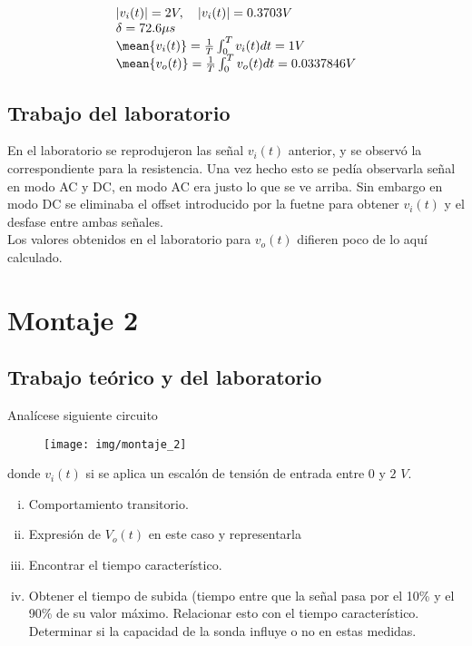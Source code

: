 \documentclass[a4paper,10pt]{article}
\begin{document}
\begin{equation}
 \begin{array}{l}
  |v_i(t)| = 2 V, \quad |v_i(t)| = 0.3703 V \\
  \delta = 72.6 \mu s \\
  \mean{v_i(t)} = \frac{1}{T} \int^T_0 v_i(t) dt = 1 V \\
  \mean{v_o(t)} = \frac{1}{T} \int^T_0 v_o(t) dt = 0.0337846 V
 \end{array}
\end{equation}

\subsection{Trabajo del laboratorio}

En el laboratorio se reprodujeron las señal $v_i(t)$ anterior, y se observó la correspondiente para la resistencia. Una
vez hecho esto se pedía observarla señal en modo AC y DC, en modo AC era justo lo que se ve arriba. Sin embargo en modo
DC se eliminaba el offset introducido por la fuetne para obtener $v_i(t)$ y el desfase entre ambas señales. \\ 

Los valores obtenidos en el laboratorio para $v_o(t)$ difieren poco de lo aquí calculado. 

\section{Montaje 2}

\subsection{Trabajo teórico y del laboratorio}

Analícese siguiente circuito

\begin{figure}[h!]
 \centering
 \texttt{[image: img/montaje\_2]}
\end{figure}

donde $v_i(t)$ si se aplica un escalón de tensión de entrada entre $0$ y $2$ $V$. 

\begin{enumerate}[(i)]
 \item Comportamiento transitorio.
 \item Expresión de $V_o(t)$ en este caso y representarla
 \item Encontrar el tiempo característico. 
 \item Obtener el tiempo de subida (tiempo entre que la señal pasa por el 10\% y el 90\% de su valor máximo. Relacionar
esto con el tiempo característico. Determinar si la capacidad de la sonda influye o no en estas medidas.  
\end{enumerate}
\end{document}
